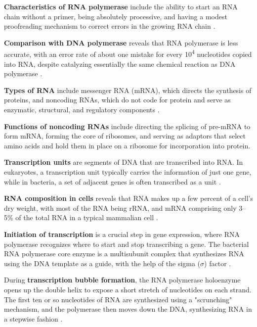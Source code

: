 \textbf{Characteristics of RNA polymerase} include the ability to start an RNA chain without a primer, being absolutely processive, and having a modest proofreading mechanism to correct errors in the growing RNA chain \cite*{L1-Chapter6}.

\textbf{Comparison with DNA polymerase} reveals that RNA polymerase is less accurate, with an error rate of about one mistake for every 10\textsuperscript{4} nucleotides copied into RNA, despite catalyzing essentially the same chemical reaction as DNA polymerase \cite*{L1-Chapter6}.

\textbf{Types of RNA} include messenger RNA (mRNA), which directs the synthesis of proteins, and noncoding RNAs, which do not code for protein and serve as enzymatic, structural, and regulatory components \cite*{L1-Chapter6}.

\textbf{Functions of noncoding RNAs} include directing the splicing of pre-mRNA to form mRNA, forming the core of ribosomes, and serving as adaptors that select amino acids and hold them in place on a ribosome for incorporation into protein\cite*{L1-Chapter6}.

\textbf{Transcription units} are segments of DNA that are transcribed into RNA. In eukaryotes, a transcription unit typically carries the information of just one gene, while in bacteria, a set of adjacent genes is often transcribed as a unit \cite*{L1-Chapter6}.

\textbf{RNA composition in cells} reveals that RNA makes up a few percent of a cell's dry weight, with most of the RNA being rRNA, and mRNA comprising only 3–5\% of the total RNA in a typical mammalian cell \cite*{L1-Chapter6}.

\textbf{Initiation of transcription} is a crucial step in gene expression, where RNA polymerase recognizes where to start and stop transcribing a gene. The bacterial RNA polymerase core enzyme is a multisubunit complex that synthesizes RNA using the DNA template as a guide, with the help of the sigma ($\sigma$) factor \cite*{L1-Chapter6}.

During \textbf{transcription bubble formation}, the RNA polymerase holoenzyme opens up the double helix to expose a short stretch of nucleotides on each strand. The first ten or so nucleotides of RNA are synthesized using a "scrunching" mechanism, and the polymerase then moves down the DNA, synthesizing RNA in a stepwise fashion \cite*{L1-Chapter6}.

